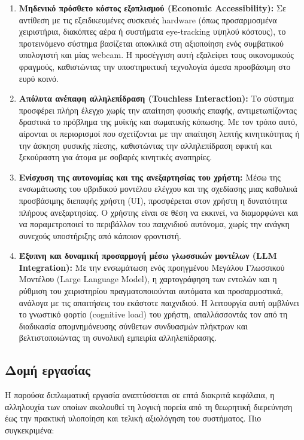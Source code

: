 \documentclass[twoside, a4paper, 11pt]{article}
\begin{document}
\begin{enumerate}
    \item \textbf{Μηδενικό πρόσθετο κόστος εξοπλισμού (Economic Accessibility):} 
    Σε αντίθεση με τις εξειδικευμένες συσκευές hardware (όπως προσαρμοσμένα χειριστήρια, διακόπτες αέρα ή συστήματα eye-tracking υψηλού κόστους), το προτεινόμενο σύστημα βασίζεται αποκλικά στη αξιοποίηση ενός συμβατικού υπολογιστή και μίας webcam. Η προσέγγιση αυτή εξαλείφει τους οικονομικούς φραγμούς, καθιστώντας την υποστηρικτική τεχνολογία άμεσα προσβάσιμη στο ευρύ κοινό.

    \item \textbf{Απόλυτα ανέπαφη αλληλεπίδραση (Touchless Interaction):} 
    Το σύστημα προσφέρει πλήρη έλεγχο χωρίς την απαίτηση φυσικής επαφής, αντιμετωπίζοντας δραστικά το πρόβλημα της μυϊκής και σωματικής κόπωσης. Με τον τρόπο αυτό, αίρονται οι περιορισμοί που σχετίζονται με την απαίτηση λεπτής κινητικότητας ή την άσκηση φυσικής πίεσης, καθιστώντας την αλληλεπίδραση εφικτή και ξεκούραστη για άτομα με σοβαρές κινητικές αναπηρίες.

    \item \textbf{Ενίσχυση της αυτονομίας και της ανεξαρτησίας του χρήστη:} 
    Μέσω της ενσωμάτωσης του υβριδικού μοντέλου ελέγχου και της σχεδίασης μιας καθολικά προσβάσιμης διεπαφής χρήστη (UI), προσφέρεται στον χρήστη η δυνατότητα πλήρους ανεξαρτησίας. Ο χρήστης είναι σε θέση να εκκινεί, να διαμορφώνει και να παραμετροποιεί το περιβάλλον του παιχνιδιού αυτόνομα, χωρίς την ανάγκη συνεχούς υποστήριξης από κάποιον φροντιστή.

    \item \textbf{Έξυπνη και δυναμική προσαρμογή μέσω γλωσσικών μοντέλων (LLM Integration):} 
    Με την ενσωμάτωση ενός προηγμένου Μεγάλου Γλωσσικού Μοντέλου (Large Language Model), η χαρτογράφηση των εντολών και η ρύθμιση του χειριστηρίου πραγματοποιούνται αυτόματα και προσαρμοστικά, ανάλογα με τις απαιτήσεις του εκάστοτε παιχνιδιού. Η λειτουργία αυτή αμβλύνει το γνωστικό φορτίο (cognitive load) του χρήστη, απαλλάσσοντάς τον από τη διαδικασία απομνημόνευσης σύνθετων συνδυασμών πλήκτρων και βελτιστοποιώντας τη συνολική εμπειρία αλληλεπίδρασης.
\end{enumerate}
\subsection{Δομή εργασίας}
Η παρούσα διπλωματική εργασία αναπτύσσεται σε επτά διακριτά κεφάλαια, η αλληλουχία των οποίων ακολουθεί τη λογική πορεία από τη θεωρητική διερεύνηση έως την πρακτική υλοποίηση και τελική αξιολόγηση του συστήματος. Πιο συγκεκριμένα:
\end{document}
